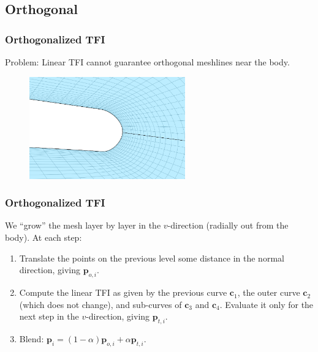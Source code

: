 \documentclass{beamer}
\begin{document}
\subsection{Orthogonal}

\begin{frame}
  \frametitle{Orthogonalized TFI}

  Problem: Linear TFI cannot guarantee orthogonal meshlines near the body.
  
  \begin{figure}
    \centering
    \includegraphics[width=0.6\textwidth]{figs/nonorthogonal}
  \end{figure}
\end{frame}

\begin{frame}
  \frametitle{Orthogonalized TFI}

  We ``grow'' the mesh layer by layer in the $v$-direction (radially out from the body). At each step:

  \begin{enumerate}
    \item Translate the points on the previous level some distance in the normal direction, giving
      $\mathbf{p}_{o,i}$.
    \item Compute the linear TFI as given by the previous curve $\mathbf{c}_1$, the outer curve
      $\mathbf{c}_2$ (which does not change), and sub-curves of $\mathbf{c}_3$ and $\mathbf{c}_4$.
      Evaluate it only for the next step in the $v$-direction, giving $\mathbf{p}_{t,i}$.
    \item Blend: $\mathbf{p}_i = (1-\alpha)\mathbf{p}_{o,i} + \alpha\mathbf{p}_{t,i}$.
  \end{enumerate}
\end{frame}
\end{document}
